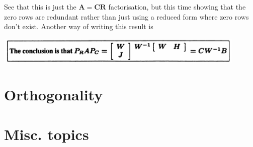 \documentclass{report}
\begin{document}
See that this is just the $\bm A=\bm{CR}$ factorisation, but this time showing that the zero rows are redundant rather than just using a reduced form where zero rows don't
exist. Another way of writing this result is
\begin{center}
\includegraphics[width=12cm]{48}
\end{center}
\newpage

\chapter{Orthogonality}







\appendix
\chapter{Misc. topics}
\end{document}
